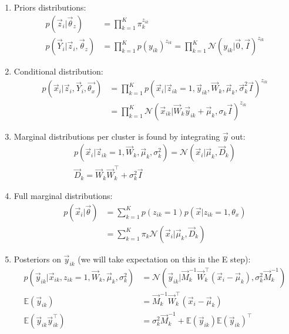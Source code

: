 \documentclass[12pt,twoside]{article}
\begin{document}
\begin{enumerate}
\item Priors distributions:
	\begin{align*}
		p(\vec{z}_i \vert \vec{\theta}_z) & = \prod_{k=1}^K \pi_k^{z_{ik}}\\
		p(\vec{Y}_i \vert \vec{z}_i, \vec{\theta}_z) & = \prod_{k=1}^K p(y_{ik})^{z_{ik}} = \prod_{k=1}^K \mathcal{N}(y_{ik}\vert \vec{0}, \vec{I})^{z_{ik}}
	\end{align*}

\item Conditional distribution:
	\begin{align*}
		p(\vec{x}_i \vert \vec{z}_i, \vec{Y}_i, \vec{\theta_x}) 
		& = \prod_{k=1}^K p(\vec{x}_i \vert \vec{z}_{ik}=1, \vec{y}_{ik}, \vec{W}_k, \vec{\mu}_k, \vec{\sigma}_k^2\vec{I})^{z_{ik}}\\
		& = \prod_{k=1}^K \mathcal{N}(\vec{x}_{ik}\vert \vec{W}_k \vec{y}_{ik}+\vec{\mu}_k, \sigma_k\vec{I})^{z_{ik}}		
	\end{align*}

\item Marginal distributions per cluster is found by integrating $\vec{y}$ out:
	\begin{align*}
		p(\vec{x}_i \vert \vec{z}_{ik}=1, \vec{W}_k, \vec{\mu}_k, \sigma_k^2) = \mathcal{N}(\vec{x}_i\vert \vec{\mu}_k, \vec{D}_k)\\
		\vec{D}_k = \vec{W}_k\vec{W}_k^\top + \sigma_k^2 \vec{I}
	\end{align*}

\item Full marginal distributions:
	\begin{align*}
		p(\vec{x}_i \vert \vec{\theta}) 
		&= \sum_{k=1}^K p(z_{ik}=1)p(\vec{x}\vert z_{ik}=1, \theta_x)\\
		&= \sum_{k=1}^K \pi_k \mathcal{N}(\vec{x}_i\vert \vec{\mu}_k, \vec{D}_k)		
	\end{align*}

\item Posteriors on $\vec{y}_{ik}$ (we will take expectation on this in the E step):
	\begin{align*}
		p(\vec{y}_{ik} \vert \vec{x}_{ik}, z_{ik}=1, \vec{W}_{k}, \vec{\mu}_{k}, \sigma_k^2 )
		&= \mathcal{N}\left(\vec{y}_{ik}\vert \vec{M}_k^{-1}\vec{W}_k^\top(\vec{x}_i - \vec{\mu}_k),\sigma_k^2 \vec{M}_k^{-1}\right)\\
		\mathbb{E}(\vec{y}_{ik})& = \vec{M}_k^{-1}\vec{W}_k^\top (\vec{x}_i - \vec{\mu}_k)\\
		\mathbb{E}(\vec{y}_{ik}\vec{y}_{ik}^\top)& =\sigma_k^2\vec{M}_k^{-1}+\mathbb{E}(\vec{y}_{ik})\mathbb{E}(\vec{y}_{ik})^\top
	\end{align*}


\end{enumerate}
\end{document}
